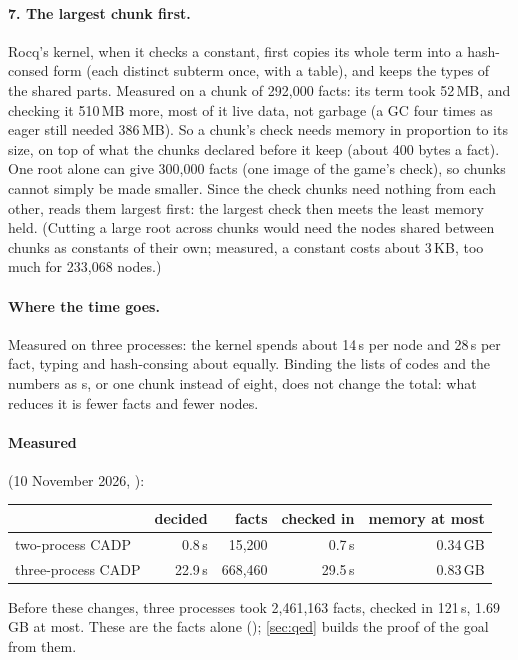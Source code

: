 \paragraph{7. The largest chunk first.} Rocq's kernel, when it checks a
constant, first copies its whole term into a hash-consed form (each
distinct subterm once, with a table), and keeps the types of the shared
parts. Measured on a chunk of 292,000 facts: its term took 52\,MB, and
checking it 510\,MB more, most of it live data, not garbage (a GC four
times as eager still needed 386\,MB). So a chunk's check needs memory in
proportion to its size, on top of what the chunks declared before it keep
(about 400 bytes a fact). One root alone can give 300,000 facts (one
image of the game's check), so chunks cannot simply be made smaller. Since the
check chunks need nothing from each other,  reads them
largest first: the largest check then meets the least memory held.
(Cutting a large root across chunks would need the nodes shared between
chunks as constants of their own; measured, a constant costs about 3\,KB,
too much for 233,068 nodes.)

\paragraph{Where the time goes.} Measured on three processes: the kernel
spends about 14\,\textmu s per node  and 28\,\textmu s per fact,
typing and hash-consing about equally. Binding the lists of codes and the
numbers as s, or one chunk instead of eight, does not change the
total: what reduces it is fewer facts and fewer nodes.

\paragraph{Measured} (10 November 2026, ):
\begin{center}
\small
\begin{tabular}{@{}lrrrr@{}}
\toprule
 & decided & facts & checked in & memory at most \\
\midrule
two-process CADP & 0.8\,s & 15,200 & 0.7\,s & 0.34\,GB \\
three-process CADP & 22.9\,s & 668,460 & 29.5\,s & 0.83\,GB \\
\bottomrule
\end{tabular}
\end{center}
Before these changes, three processes took 2,461,163 facts, checked in
121\,s, 1.69\,GB at most. These are the facts alone (); \cref{sec:qed} builds the proof of the goal from them.

